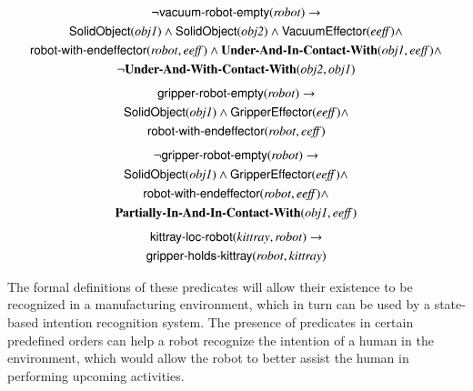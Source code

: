 \documentclass[final,1p,times]{elsarticle}
\newcommand{\class}[1] {\textsf{#1}}
\newcommand{\stvar}[1] {\textsf{#1}}
\begin{document}
\begin{gather}
\label{eq:neg-vacuum-robot-empty}
\neg\stvar{vacuum-robot-empty}(\mathit{robot}) \rightarrow \\
\class{SolidObject}(\mathit{obj1}) \wedge \class{SolidObject}(\mathit{obj2}) \wedge \class{VacuumEffector}(\mathit{eeff}) \wedge\notag\\
\stvar{robot-with-endeffector}(\mathit{robot},\mathit{eeff}) \wedge \textbf{Under-And-In-Contact-With}(\mathit{obj1},\mathit{eeff}) \wedge \notag\\
\neg \textbf{Under-And-With-Contact-With}(\mathit{obj2},\mathit{obj1})\notag
\end{gather}
\begin{gather}
\label{eq:gripper-robot-empty}
\stvar{gripper-robot-empty}(\mathit{robot}) \rightarrow \\
\class{SolidObject}(\mathit{obj1}) \wedge \class{GripperEffector}(\mathit{eeff}) \wedge\notag\\
\stvar{robot-with-endeffector}(\mathit{robot},\mathit{eeff}) \notag
\end{gather}
\begin{gather}
\label{eq:neg-gripper-robot-empty}
\neg\stvar{gripper-robot-empty}(\mathit{robot}) \rightarrow \\
\class{SolidObject}(\mathit{obj1}) \wedge \class{GripperEffector}(\mathit{eeff}) \wedge\notag\\
\stvar{robot-with-endeffector}(\mathit{robot},\mathit{eeff}) \wedge\notag\\
\textbf{Partially-In-And-In-Contact-With}(\mathit{obj1},\mathit{eeff})\notag
\end{gather}
\begin{gather}
\label{eq:kittray-loc-robot}
\stvar{kittray-loc-robot}(\mathit{kittray},\mathit{robot}) \rightarrow \\
\stvar{gripper-holds-kittray}(\mathit{robot},\mathit{kittray}) \notag
\end{gather}


The formal definitions of these predicates will allow their existence to be recognized in a manufacturing environment, which in turn can be used by a state-based intention recognition system. The presence of predicates in certain predefined orders can help a robot recognize the intention of a human in the environment, which would allow the robot to better assist the human in performing upcoming activities.

\end{document}
